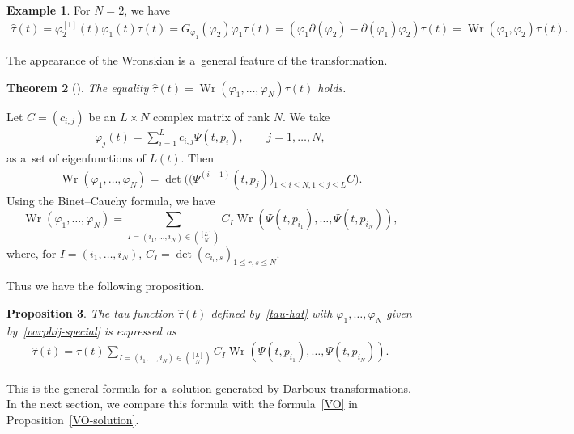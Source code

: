 \documentclass[10pt,a4paper]{amsart}
\numberwithin{equation}{section}
\newtheorem{Theorem}{Theorem}[section]
\newtheorem{Proposition}[Theorem]{Proposition}
\theoremstyle{definition}
\newtheorem{Example}[Theorem]{Example}
\begin{document}
\begin{Example}For $N=2$, we have
\begin{gather*}
\widehat{\tau}(t)=\varphi_2^{[1]}(t)\varphi_1(t)\tau(t)=G_{\varphi_1}(\varphi_2)\varphi_1\tau(t)
=(\varphi_1\partial(\varphi_2)-\partial(\varphi_1)\varphi_2)\tau(t)=\operatorname{Wr}(\varphi_1,\varphi_2)\tau(t).
\end{gather*}
\end{Example}

The appearance of the Wronskian is a~general feature of the transformation.

\begin{Theorem}[\cite{H-van-de-Leur2001,Kac-van-de-Leur2018,Kakei,Ovel1993}] The equality
$\widehat{\tau}(t)=\operatorname{Wr}(\varphi_1,\dots ,\varphi_N)\tau(t)$ holds.
\end{Theorem}


Let $C=(c_{i,j})$ be an $L\times N$ complex matrix of rank $N$. We take
\begin{gather}
\varphi_j(t)=\sum_{i=1}^Lc_{i,j}\Psi(t,p_i),
\qquad
j=1,\dots ,N,
\label{varphij-special}
\end{gather}
as a~set of eigenfunctions of $L(t)$.
Then
\begin{gather*}
\operatorname{Wr}(\varphi_1,\dots ,\varphi_N)
=\det\bigl(\bigl(\Psi^{(i-1)}(t,p_j)\bigr)_{1\leq i\leq N,1\leq j\leq L} C\bigr).
\end{gather*}
Using the Binet--Cauchy formula, we have
\[
\operatorname{Wr}(\varphi_1,\dots ,\varphi_N)=\sum_{I=(i_1,\dots ,i_N)\in \binom{[L]}{N}}
C_I \operatorname{Wr}(\Psi(t,p_{i_1}),\dots ,\Psi(t,p_{i_N})),
\label{pre-Darboux}
\]
where, for $I=(i_1,\dots ,i_N)$,
$
C_I=\det(c_{i_r,s})_{1\leq r,s\leq N}$.


Thus we have the following proposition.

\begin{Proposition}\label{Darboux-composition} The tau function $\widehat{\tau}(t)$ defined by~\eqref{tau-hat} with
$\varphi_1,\dots ,\varphi_N$ given by~\eqref{varphij-special} is expressed as
\begin{gather}
\widehat{\tau}(t)=\tau(t)\sum_{I=(i_1,\dots ,i_N)\in \binom{[L]}{N}}
C_I \operatorname{Wr} (\Psi(t,p_{i_1}),\dots ,\Psi(t,p_{i_N}) ).
\label{Darboux}
\end{gather}
\end{Proposition}

This is the general formula for a~solution generated by Darboux transformations.
In the next section, we compare this formula with the formula~\eqref{VO} in
Proposition~\ref{VO-solution}.
\end{document}
